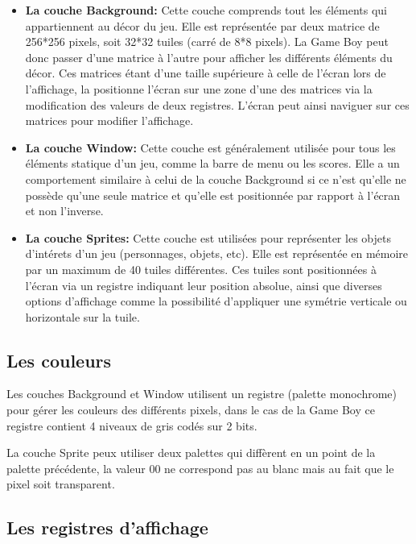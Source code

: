 \documentclass{report}
\begin{document}
\begin{itemize}
\item \textbf{La couche Background:}
	Cette couche comprends tout les éléments qui appartiennent au décor du
jeu. Elle est représentée par deux matrice de 256*256 pixels, soit 32*32
tuiles (carré de 8*8 pixels). La Game Boy peut donc passer d'une matrice à
l'autre pour afficher les différents éléments du décor. Ces matrices étant
d'une taille supérieure à celle de l'écran lors de l'affichage, la positionne
l'écran sur une zone d'une des matrices via la modification des valeurs de
deux registres. L'écran peut ainsi naviguer sur ces matrices pour modifier
l'affichage.\\

\item \textbf{La couche Window:}
	Cette couche est généralement utilisée pour tous les éléments statique
d'un jeu, comme la barre de menu ou les scores. Elle a un comportement
similaire à celui de la couche Background si ce n'est qu'elle ne possède qu'une seule
matrice et qu'elle est positionnée par rapport à l'écran et non l'inverse.\\

\item \textbf{La couche Sprites:}
	Cette couche est utilisées pour représenter les objets d'intérets d'un
jeu (personnages, objets, etc). Elle est représentée en mémoire par un maximum
de 40 tuiles différentes. Ces tuiles sont positionnées à l'écran via un registre indiquant leur position absolue, ainsi que diverses options d'affichage comme la possibilité d'appliquer une symétrie verticale ou horizontale sur la tuile.\\
\end{itemize}

\subsection{Les couleurs}

Les couches Background et Window utilisent un registre (palette monochrome) pour gérer les
couleurs des différents pixels, dans le cas de la Game Boy ce registre contient
4 niveaux de gris codés sur 2 bits.

La couche Sprite peux utiliser deux palettes qui diffèrent en un point de la
palette précédente, la valeur 00 ne correspond pas au blanc mais au fait que
le pixel soit transparent.\\

\subsection{Les registres d'affichage}
\end{document}
